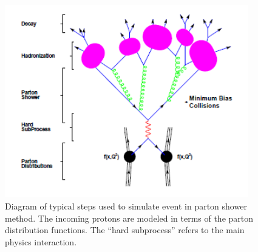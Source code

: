



 \begin{figure}[htb]
  \begin{center}
    \includegraphics[width=300pt]{Figures/mc-partonShower-lesHouches.png}
  \end{center}
  \caption[\fixspacing Diagram of typical steps used to simulate event in parton shower method]
	  {\fixspacing Diagram of typical steps used to simulate event in parton shower method.
	    The incoming protons are modeled in terms of the 
	    parton distribution functions. 
	    The ``hard subprocess'' refers to the main 
	    physics interaction.  
	  }
  \label{fig:MCsteps}
 \end{figure}



